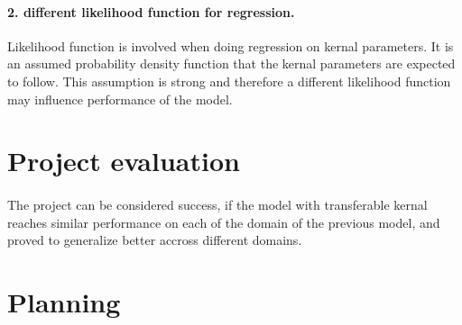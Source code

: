 \documentclass{article}
\begin{document}
\paragraph{2. different likelihood function for regression.} Likelihood function is involved when doing regression on kernal parameters. It is an assumed probability density function that the kernal parameters are expected to follow. This assumption is strong and therefore a different likelihood function may influence performance of the model.
\section{Project evaluation}
\paragraph{}
The project can be considered success, if the model with transferable kernal reaches similar performance on each of the domain of the previous model, and proved to generalize better accross different domains.
\section{Planning}


\end{document}
